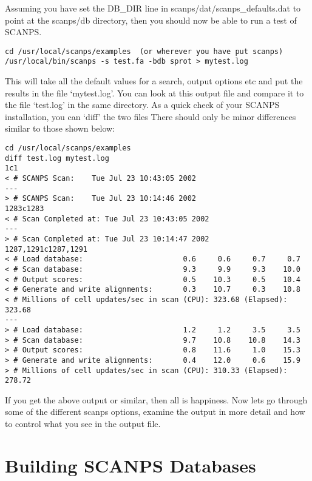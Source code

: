 \documentclass[12pt]{article}
\begin{document}
\begin{enumerate}
Assuming you have set the DB\_DIR line in
scanps/dat/scanps\_defaults.dat to point at the scanps/db directory,
then you should now be able to run a test of SCANPS.

\begin{verbatim}
cd /usr/local/scanps/examples  (or wherever you have put scanps)
/usr/local/bin/scanps -s test.fa -bdb sprot > mytest.log
\end{verbatim}

This will take all the default values for a search, output options etc
and put the results in the file `mytest.log'.  You can look at this
output file and compare it to the file `test.log' in the same
directory.  As a quick check of your SCANPS installation, you can
`diff' the two files  There should only be minor differences similar
to those shown below:

\begin{scriptsize}
\begin{verbatim}
cd /usr/local/scanps/examples
diff test.log mytest.log
1c1
< # SCANPS Scan:    Tue Jul 23 10:43:05 2002
---
> # SCANPS Scan:    Tue Jul 23 10:14:46 2002
1283c1283
< # Scan Completed at: Tue Jul 23 10:43:05 2002
---
> # Scan Completed at: Tue Jul 23 10:14:47 2002
1287,1291c1287,1291
< # Load database:                       0.6     0.6     0.7     0.7
< # Scan database:                       9.3     9.9     9.3    10.0
< # Output scores:                       0.5    10.3     0.5    10.4
< # Generate and write alignments:       0.3    10.7     0.3    10.8
< # Millions of cell updates/sec in scan (CPU): 323.68 (Elapsed): 323.68
---
> # Load database:                       1.2     1.2     3.5     3.5
> # Scan database:                       9.7    10.8    10.8    14.3
> # Output scores:                       0.8    11.6     1.0    15.3
> # Generate and write alignments:       0.4    12.0     0.6    15.9
> # Millions of cell updates/sec in scan (CPU): 310.33 (Elapsed): 278.72
\end{verbatim}
\end{scriptsize}
\end{enumerate}

If you get the above output or similar, then all is happiness. Now
lets go through some of the different scanps options, examine the
output in more detail and how to control what you see in the output
file.

\section{Building SCANPS Databases}
\end{document}
